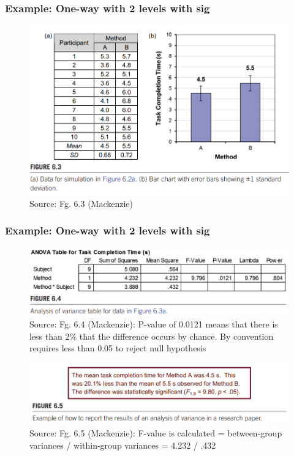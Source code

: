 \documentclass{beamer}
\begin{document}
%	

\begin{frame}
	\frametitle{Example: One-way with 2 levels with sig} 
	\begin{figure}
		\includegraphics[width=0.8\linewidth]{resulta}
		\caption{Source: Fg. 6.3 (Mackenzie)}
	\end{figure}
	
\end{frame}

\begin{frame}
	\frametitle{Example: One-way with 2 levels with sig} 
	\begin{figure}
		\includegraphics[width=0.6\linewidth]{resulta2}
		\caption{Source: Fg. 6.4 (Mackenzie): P-value of 0.0121 means that there is less than 2\% that the difference occurs by chance. By convention requires less than 0.05 to reject null hypothesis}
	\end{figure}
		\begin{figure}
		\includegraphics[width=0.8\linewidth]{resulta3}
		\caption{Source: Fg. 6.5 (Mackenzie): F-value is calculated = between-group variances / within-group variances = 4.232 / .432 }
	\end{figure}
\end{frame}
\end{document}
